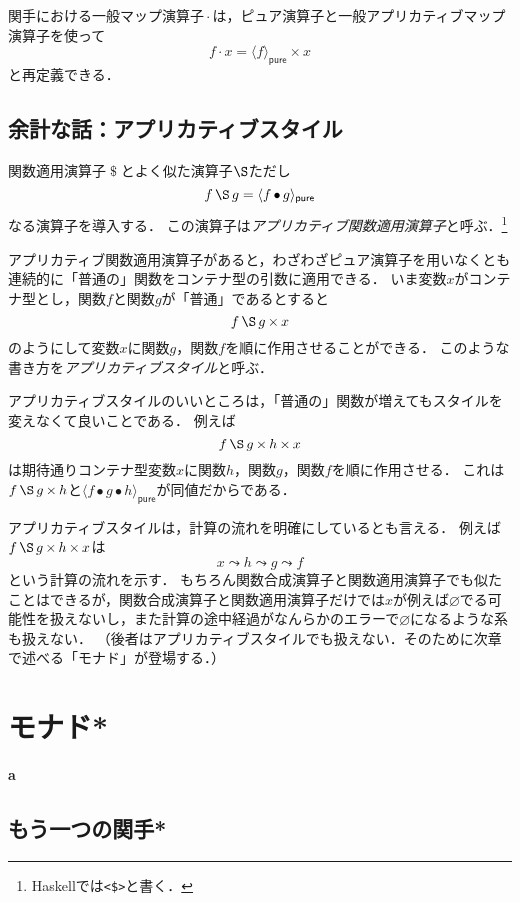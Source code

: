 \documentclass[twocolumn]{jsbook}
\newcommand{\keyword}[1]{\emph{#1}}
\newcommand{\code}[1]{\texttt{#1}}
\newenvironment{leader}{\begingroup\bf}{\endgroup}
\DeclareMathOperator{\hsklApplicativeApply}{\S}
\DeclareMathOperator{\hsklApplicativeMap}{\times}
\DeclareMathOperator{\hsklFmap}{\cdot}
\newcommand{\hsklNothing}{\varnothing}
\newcommand{\hsklPure}[1]{\langle#1\rangle_\textsf{pure}}
\DeclareMathOperator{\mathApply}{\$}
\DeclareMathOperator{\mathCompose}{\bullet}
\begin{document}
関手における一般マップ演算子$\hsklFmap$は，ピュア演算子と一般アプリカティブマップ演算子を使って$$f\hsklFmap x=\hsklPure{f}\hsklApplicativeMap x$$と再定義できる．

\section*{余計な話：アプリカティブスタイル}

関数適用演算子$\mathApply$とよく似た演算子$\hsklApplicativeApply$ただし
$$f\hsklApplicativeApply g=\hsklPure{f\mathCompose g}$$
なる演算子を導入する．
この演算子は\keyword{アプリカティブ関数適用演算子}と呼ぶ．\footnote{Haskellでは\code{<\$>}と書く．}

アプリカティブ関数適用演算子があると，わざわざピュア演算子を用いなくとも連続的に「普通の」関数をコンテナ型の引数に適用できる．
いま変数$x$がコンテナ型とし，関数$f$と関数$g$が「普通」であるとすると$$f\hsklApplicativeApply g\hsklApplicativeMap x$$のようにして変数$x$に関数$g$，関数$f$を順に作用させることができる．
このような書き方を\keyword{アプリカティブスタイル}と呼ぶ．

アプリカティブスタイルのいいところは，「普通の」関数が増えてもスタイルを変えなくて良いことである．
例えば$$f\hsklApplicativeApply g\hsklApplicativeMap h\hsklApplicativeMap x$$は期待通りコンテナ型変数$x$に関数$h$，関数$g$，関数$f$を順に作用させる．
これは$f\hsklApplicativeApply g\hsklApplicativeMap h$と$\hsklPure{f\mathCompose g\mathCompose h}$が同値だからである．

アプリカティブスタイルは，計算の流れを明確にしているとも言える．
例えば$f\hsklApplicativeApply g\hsklApplicativeMap h\hsklApplicativeMap x$は$$x\leadsto h\leadsto g\leadsto f$$という計算の流れを示す．
もちろん関数合成演算子と関数適用演算子でも似たことはできるが，関数合成演算子と関数適用演算子だけでは$x$が例えば$\hsklNothing$でる可能性を扱えないし，また計算の途中経過がなんらかのエラーで$\hsklNothing$になるような系も扱えない．
（後者はアプリカティブスタイルでも扱えない．そのために次章で述べる「モナド」が登場する．）


\chapter{モナド*}


\begin{leader}
a
\end{leader}


\section{もう一つの関手*}
\end{document}
